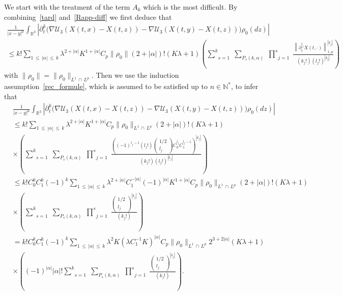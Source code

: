 \documentclass[10pt]{amsart}
\theoremstyle{definition}\newtheorem{defi}[theo]{Definition}\newtheorem{rema}[theo]{Remark}\newtheorem{exam}[theo]{Example}\newtheorem{exem}[theo]{Example}\newtheorem{nota}[theo]{Notation}
\newcommand{\R}{\mathbb{R}}
\newcommand{\N}{\mathbb{N}}
\newcommand{\clU}{\mathcal{U}}
\renewcommand{\leq}{\leqslant}
\begin{document}
We start with the treatment of the term $A_k$ which is the most difficult. By combining~\eqref{tard} and~\eqref{Rapp-diff} we first deduce that
\begin{multline*}
\frac{1}{|x-y|^\mu}\int_{\R^3}
\left| \partial_t^k \big(\nabla \clU_3(X(t,x)-X(t,z))-\nabla \clU_3(X(t,y)-X(t,z)) \big)\rho_0(dz) \right| \\
 \leq k! \underset{1\,\leq\,|\alpha|\,\leq\,k}{\sum} \lambda^{2+|\alpha|} K^{1+|\alpha|}C_p \|\rho_0\|(2+|\alpha|)! \left(K\lambda+1 \right)\left(\underset{s=1}{\overset{k}{\sum}}\;\underset{P_s(k,\alpha)}{\sum}\;\underset{j=1}{\overset{s}{\prod}}\;\frac{\left\|\partial_t^{l_j}X(t,\cdot)\right\|_{1,\mu}^{\left|k_j\right|}}{(k_j!) (l_j!)^{|k_j|}}\right)
\end{multline*}
with $\|\rho_0\|=\|\rho_0\|_{L^1\,\cap\,L^p}$. Then we use the induction assumption~\eqref{rec_formule}, which is assumed to be satisfied up to $n \in \N^*$, to infer that
\begin{align*}
&\frac{1}{|x-y|^\mu}\int_{\R^3} \left| \partial_t^k \big(\nabla \clU_3(X(t,x)-X(t,z))-\nabla \clU_3(X(t,y)-X(t,z)) \big)\rho_0(dz) \right| \\
& \leq k! \underset{1\, \leq\,|\alpha|\,\leq\,k}{\sum} \lambda^{2+|\alpha|} K^{1+|\alpha|}C_p \|\rho_0\|_{L^1\,\cap\,L^p}(2+|\alpha|)! \left(K\lambda+1 \right)\\
&\times \left(\underset{s=1}{\overset{k}{\sum}}\;\underset{P_s(k,\alpha)}{\sum}\;\underset{j=1}{\overset{s}{\prod}}\;\frac{\left((-1)^{l_j-1} \left(l_j!\right)
\begin{pmatrix}
1/2\\ l_j
\end{pmatrix}C_0^{l_j}C_1^{l_j-1}\right)^{\left|k_j\right|}}{\left(k_j!\right) \left(l_j!\right)^{\left|k_j\right|}}\right)\\
& \leq k!C_0^k C_1^k (-1)^k \underset{1\,\leq\,|\alpha|\,\leq\,k}{\sum} \lambda^{2+|\alpha|} C_1^{-|\alpha|}(-1)^{|\alpha|}K^{1+|\alpha|}C_p \|\rho_0\|_{L^1\,\cap\,L^p}(2+|\alpha|)! \left(K\lambda+1 \right)\\
&\times \left(\underset{s=1}{\overset{k}{\sum}}\;\underset{P_s(k,\alpha)}{\sum}\;\underset{j=1}{\overset{s}{\prod}}\;\frac{
\begin{pmatrix}
1/2\\ l_j
\end{pmatrix}^{|k_j|}}{(k_j!)}\right)\\
&= k!C_0^k C_1^k (-1)^k \underset{1\,\leq\,|\alpha|\,\leq\,k}{\sum} \lambda^{2} K\left(\lambda C_1^{-1}K\right)^{|\alpha|}C_p \|\rho_0\|_{L^1\,\cap\,L^p}2^{3+2|\alpha|}\left(K\lambda+1\right)\\
&\times \left((-1)^{|\alpha|} |\alpha|! \underset{s=1}{\overset{k}{\sum}}\;\underset{P_s(k,\alpha)}{\sum}\;\underset{j=1}{\overset{s}{\prod}}\;\frac{
\begin{pmatrix}
1/2\\ l_j
\end{pmatrix}^{|k_j|}}{(k_j!)}\right).
\end{align*}
\end{document}
